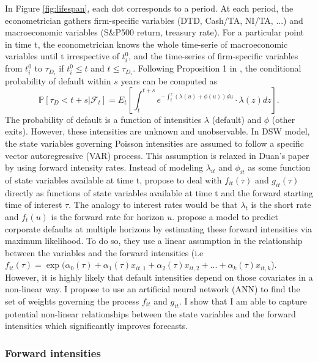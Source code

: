 In Figure \ref{fig:lifespan}, each dot corresponds to a period. At each period, the econometrician gathers firm-specific variables (DTD, Cash/TA, NI/TA, ...) and macroeconomic variables (S\&P500 return, treasury rate). For a particular point in time t, the econometrician knows the whole time-serie of macroeconomic variables until t irrespective of $t_i^0$, and the time-series of firm-specific variables from $t_i^0$ to $\tau_{D_i}$ if $t_i^0 \leq t$ and $t \leq \tau_{D_i}$.
Following Proposition 1 in \citet{DSW}, the conditional probability of default within $s$ years can be computed as 
\begin{equation} \label{eq:3.6}
\mathbb{P}[ \tau_D <t+s |\mathscr{F}_t] = E_t \left[ \int_t^{t+s}  e^{-\int_t^z (\lambda(u)+\phi(u)) du} \cdot \lambda(z) dz \right].
\end{equation}
The probability of default is a function of intensities $\lambda$ (default) and $\phi$ (other exits). However, these intensities are unknown and unobservable. In DSW model, the state variables governing Poisson intensities are assumed to follow a specific vector autoregressive (VAR) process. This assumption is relaxed in Duan's paper by using forward intensity rates. Instead of modeling $\lambda_{it}$ and $\phi_{it}$ as some function of state variables available at time t, \citet{Duan2012} propose to deal with $f_{it}(\tau)$ and $g_{it}(\tau)$ directly as functions of state variables available at time t and the forward starting time of interest $\tau$. The analogy to interest rates would be that $\lambda_t$ is the short rate and $f_t(u)$ is the forward rate for horizon $u$. \citet{Duan2012} propose a model to predict corporate defaults at multiple horizons by estimating these forward intensities via maximum likelihood. To do so, they use a linear assumption in the relationship between the variables and the forward intensities (i.e $f_{it}(\tau) = \exp(\alpha_0(\tau) + \alpha_1(\tau) x_{it,1} + \alpha_2(\tau) x_{it,2} + ... + \alpha_k(\tau) x_{it,k}$). However, it is highly likely that default intensities depend on those covariates in a non-linear way. I propose to use an artificial neural network (ANN) to find the set of weights governing the process $f_{it}$ and $g_{it}$. I show that I am able to capture potential non-linear relationships between the state variables and the forward intensities which significantly improves forecasts.


\subsubsection{Forward intensities}
\label{SSS:2-1-1}

